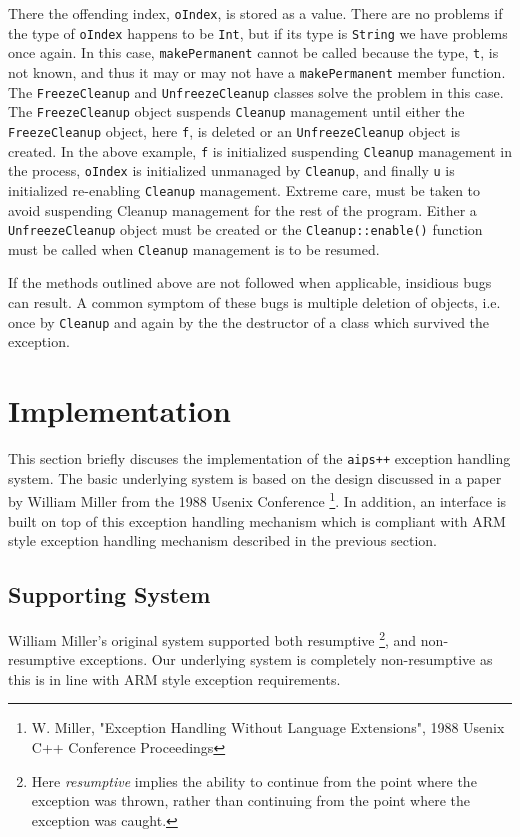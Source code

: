 There the offending index, {\tt oIndex}, is stored as a value. There are
no problems if the type of {\tt oIndex} happens to be {\tt Int}, but if 
its type is {\tt String} we have problems once again. In this case, 
{\tt makePermanent} cannot be called because the type, {\tt t}, is 
not known, and thus it may or may not have a {\tt makePermanent} member 
function. The {\tt FreezeCleanup} and {\tt UnfreezeCleanup} classes solve 
the problem in this case. The {\tt FreezeCleanup} object suspends 
{\tt Cleanup} management until either the {\tt FreezeCleanup} object, 
here {\tt f}, is deleted or an {\tt UnfreezeCleanup} object is created. In 
the above example, {\tt f} is initialized suspending {\tt Cleanup} 
management in the process, {\tt oIndex} is initialized unmanaged by 
{\tt Cleanup}, and finally {\tt u} is initialized re-enabling {\tt Cleanup}
management. Extreme care, must be taken to avoid suspending Cleanup management
for the rest of the program. Either a {\tt UnfreezeCleanup} object must be 
created or the {\tt Cleanup::enable()} function must be called when 
{\tt Cleanup} management is to be resumed.

If the methods outlined above are not followed when applicable, insidious
bugs can result. A common symptom of these bugs is multiple deletion of
objects, i.e. once by {\tt Cleanup} and again by the the destructor of
a class which survived the exception. 

\section{Implementation}

This section briefly discuses the implementation of the {\tt aips++} exception
handling system. The basic underlying system is based on the design discussed
in a paper by William Miller from the 1988 Usenix Conference 
\footnote{W. Miller, "Exception Handling Without Language Extensions", 1988 
Usenix C++ Conference Proceedings}. In addition, an interface is built on top
of this exception handling mechanism which is compliant with ARM style 
exception handling mechanism described in the previous section. 

\subsection{Supporting System}

William Miller's  original system supported both resumptive 
\footnote{Here {\em resumptive} implies the ability to continue from 
the point where the exception was thrown, rather than continuing from 
the point where the exception was caught.}, and non-resumptive exceptions. 
Our underlying system is completely non-resumptive as this is in line
with ARM style exception requirements.

